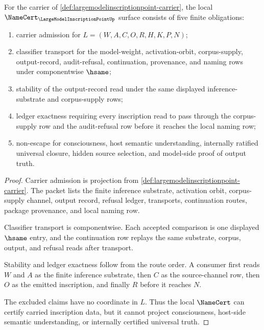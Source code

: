 \begin{theorem}
\label{thm:largemodelinscriptionpoint-namecert-obligations}
For the carrier of \autoref{def:largemodelinscriptionpoint-carrier}, the local $\NameCert_{\LargeModelInscriptionPointUp}$ surface consists of five finite obligations:
\begin{enumerate}
\item carrier admission for $L=(W,A,C,O,R,H,K,P,N)$;
\item classifier transport for the model-weight, activation-orbit, corpus-supply, output-record, audit-refusal, continuation, provenance, and naming rows under componentwise $\hsame$;
\item stability of the output-record read under the same displayed inference-substrate and corpus-supply rows;
\item ledger exactness requiring every inscription read to pass through the corpus-supply row and the audit-refusal row before it reaches the local naming row;
\item non-escape for consciousness, host semantic understanding, internally ratified universal closure, hidden source selection, and model-side proof of output truth.
\end{enumerate}
\end{theorem}
\begin{proof}
Carrier admission is projection from \autoref{def:largemodelinscriptionpoint-carrier}. The packet lists the finite inference substrate, activation orbit, corpus-supply channel, output record, refusal ledger, transports, continuation routes, package provenance, and local naming row.

Classifier transport is componentwise. Each accepted comparison is one displayed $\hsame$ entry, and the continuation row replays the same substrate, corpus, output, and refusal reads after transport.

Stability and ledger exactness follow from the route order. A consumer first reads $W$ and $A$ as the finite inference substrate, then $C$ as the source-channel row, then $O$ as the emitted inscription, and finally $R$ before it reaches $N$.

The excluded claims have no coordinate in $L$. Thus the local $\NameCert$ can certify carried inscription data, but it cannot project consciousness, host-side semantic understanding, or internally certified universal truth.
\end{proof}

